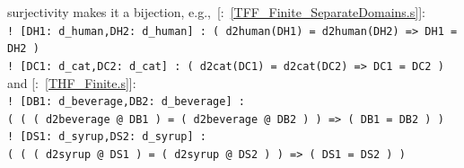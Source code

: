 \documentclass{ceurart}
\newcommand{\smalltt}[1]{\small \texttt{#1}}
\newcommand{\example}{{\scriptsize \faFile[regular]}}
\newenvironment{packed_itemize}{
\vspace*{-0.3em}
\begin{itemize}
\setlength{\partopsep}{0pt}
\setlength{\itemsep}{1pt}
\setlength{\parskip}{0pt}
\setlength{\parsep}{0pt}
}{\end{itemize}}
\begin{document}
\begin{packed_itemize}
      surjectivity makes it a bijection, e.g.,~[\example{}:~\ref{TFF_Finite_SeparateDomains.s}]:\\
      \hspace*{0.5cm}\smalltt{! [DH1: d\_human,DH2: d\_human] : ( d2human(DH1) = d2human(DH2) => DH1 = DH2 )}\\
      \hspace*{0.5cm}\smalltt{! [DC1: d\_cat,DC2: d\_cat] : ( d2cat(DC1) = d2cat(DC2) => DC1 = DC2 )}\\
      and [\example{}:~\ref{THF_Finite.s}]:\\
      \hspace*{0.5cm}\smalltt{! [DB1: d\_beverage,DB2: d\_beverage] :}\\
      \hspace*{0.8cm}\smalltt{( ( ( d2beverage @ DB1 ) = ( d2beverage @ DB2 ) ) => ( DB1 = DB2 ) )}\\
      \hspace*{0.5cm}\smalltt{! [DS1: d\_syrup,DS2: d\_syrup] :}\\
      \hspace*{0.8cm}\smalltt{( ( ( d2syrup @ DS1 ) = ( d2syrup @ DS2 ) ) => ( DS1 = DS2 ) )}
\end{packed_itemize}
\end{document}
